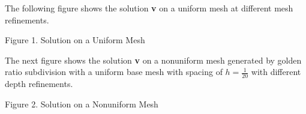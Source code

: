\documentclass[11pt, oneside]{article}   	%
\begin{document}
\begin{enumerate}
\vspace{5mm}

The following figure shows the solution \textbf{v} on a uniform mesh at different mesh refinements.

\vspace{2mm}

\centerline {}
\centerline{Figure 1. Solution on a Uniform Mesh}

\vspace{2mm}

The next figure shows the solution \textbf{v} on a nonuniform mesh generated by golden ratio subdivision with a uniform base mesh with spacing of $h = \frac{1}{20}$ with different depth refinements.

\vspace{2mm}

\centerline {}
\centerline{Figure 2. Solution on a Nonuniform Mesh}


\end{enumerate}
\end{document}
